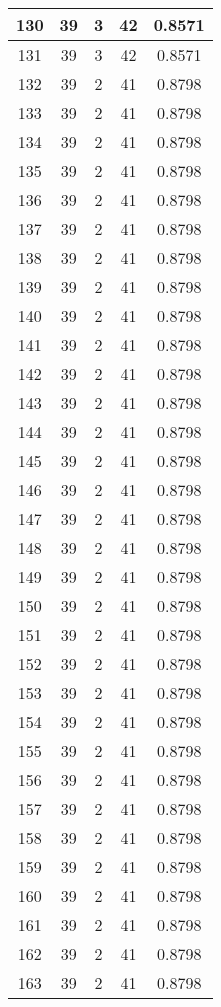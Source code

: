 \documentclass[letterpaper, 12pt]{article}
\begin{document}
\begin{longtable}{|c|c|c|c|c|}
\hline
130 & 39 & 3 & 42 & 0.8571 \\
\hline
131 & 39 & 3 & 42 & 0.8571 \\
\hline
132 & 39 & 2 & 41 & 0.8798 \\
\hline
133 & 39 & 2 & 41 & 0.8798 \\
\hline
134 & 39 & 2 & 41 & 0.8798 \\
\hline
135 & 39 & 2 & 41 & 0.8798 \\
\hline
136 & 39 & 2 & 41 & 0.8798 \\
\hline
137 & 39 & 2 & 41 & 0.8798 \\
\hline
138 & 39 & 2 & 41 & 0.8798 \\
\hline
139 & 39 & 2 & 41 & 0.8798 \\
\hline
140 & 39 & 2 & 41 & 0.8798 \\
\hline
141 & 39 & 2 & 41 & 0.8798 \\
\hline
142 & 39 & 2 & 41 & 0.8798 \\
\hline
143 & 39 & 2 & 41 & 0.8798 \\
\hline
144 & 39 & 2 & 41 & 0.8798 \\
\hline
145 & 39 & 2 & 41 & 0.8798 \\
\hline
146 & 39 & 2 & 41 & 0.8798 \\
\hline
147 & 39 & 2 & 41 & 0.8798 \\
\hline
148 & 39 & 2 & 41 & 0.8798 \\
\hline
149 & 39 & 2 & 41 & 0.8798 \\
\hline
150 & 39 & 2 & 41 & 0.8798 \\
\hline
151 & 39 & 2 & 41 & 0.8798 \\
\hline
152 & 39 & 2 & 41 & 0.8798 \\
\hline
153 & 39 & 2 & 41 & 0.8798 \\
\hline
154 & 39 & 2 & 41 & 0.8798 \\
\hline
155 & 39 & 2 & 41 & 0.8798 \\
\hline
156 & 39 & 2 & 41 & 0.8798 \\
\hline
157 & 39 & 2 & 41 & 0.8798 \\
\hline
158 & 39 & 2 & 41 & 0.8798 \\
\hline
159 & 39 & 2 & 41 & 0.8798 \\
\hline
160 & 39 & 2 & 41 & 0.8798 \\
\hline
161 & 39 & 2 & 41 & 0.8798 \\
\hline
162 & 39 & 2 & 41 & 0.8798 \\
\hline
163 & 39 & 2 & 41 & 0.8798 \\

\end{longtable}
\end{document}
